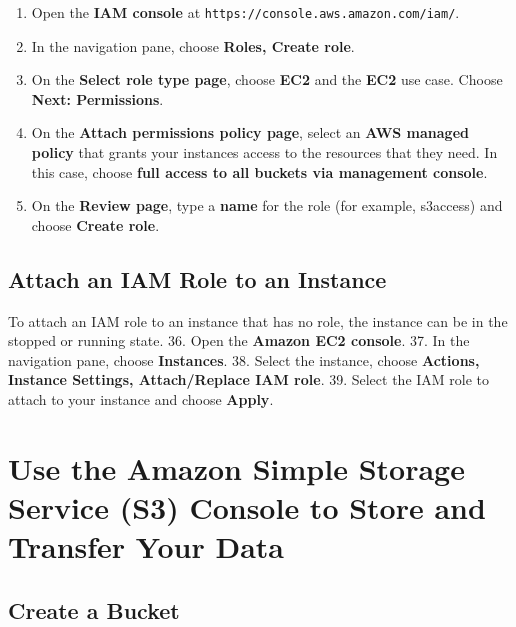 \documentclass[]{book}
\providecommand{\tightlist}{%
  \setlength{\itemsep}{0pt}\setlength{\parskip}{0pt}}
\begin{document}
\begin{enumerate}
\def\labelenumi{\arabic{enumi}.}
\setcounter{enumi}{30}
\tightlist
\item
  Open the \textbf{IAM console} at \texttt{https://console.aws.amazon.com/iam/}.
\item
  In the navigation pane, choose \textbf{Roles, Create role}.
\item
  On the \textbf{Select role type page}, choose \textbf{EC2} and the \textbf{EC2} use case. Choose \textbf{Next: Permissions}.
\item
  On the \textbf{Attach permissions policy page}, select an \textbf{AWS managed policy} that grants your instances access to the resources that they need. In this case, choose \textbf{full access to all buckets via management console}.
\item
  On the \textbf{Review page}, type a \textbf{name} for the role (for example, s3access) and choose \textbf{Create role}.
\end{enumerate}

\hypertarget{attach-an-iam-role-to-an-instance}{%
\section{Attach an IAM Role to an Instance}\label{attach-an-iam-role-to-an-instance}}

To attach an IAM role to an instance that has no role, the instance can be in the stopped or running state.
36. Open the \textbf{Amazon EC2 console}.
37. In the navigation pane, choose \textbf{Instances}.
38. Select the instance, choose \textbf{Actions, Instance Settings, Attach/Replace IAM role}.
39. Select the IAM role to attach to your instance and choose \textbf{Apply}.

\hypertarget{use-the-amazon-simple-storage-service-s3-console-to-store-and-transfer-your-data}{%
\chapter{Use the Amazon Simple Storage Service (S3) Console to Store and Transfer Your Data}\label{use-the-amazon-simple-storage-service-s3-console-to-store-and-transfer-your-data}}

\hypertarget{create-a-bucket}{%
\section{Create a Bucket}\label{create-a-bucket}}
\end{document}
